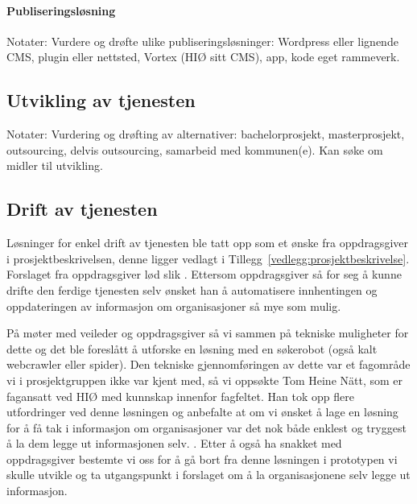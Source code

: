 \paragraph{Publiseringsløsning}
Notater:
Vurdere og drøfte ulike publiseringsløsninger: Wordpress eller lignende CMS, plugin eller nettsted, Vortex (HIØ sitt CMS), app, kode eget rammeverk.

\subsection{Utvikling av tjenesten}
Notater:
Vurdering og drøfting av alternativer: bachelorprosjekt, masterprosjekt, outsourcing, delvis outsourcing, samarbeid med kommunen(e).
Kan søke om midler til utvikling.

\subsection{Drift av tjenesten}
Løsninger for enkel drift av tjenesten ble tatt opp som et ønske fra oppdragsgiver i prosjektbeskrivelsen, denne ligger vedlagt i Tillegg~\ref{vedlegg:prosjektbeskrivelse}. Forslaget fra oppdragsgiver lød slik  \cite{PROSJEKTBESKRIVELSE:22}. Ettersom oppdragsgiver så for seg å kunne drifte den ferdige tjenesten selv ønsket han å automatisere innhentingen og oppdateringen av informasjon om organisasjoner så mye som mulig. 

På møter med veileder og oppdragsgiver så vi sammen på tekniske muligheter for dette og det ble foreslått å utforske en løsning med en søkerobot (også kalt webcrawler eller spider). Den tekniske gjennomføringen av dette var et fagområde vi i prosjektgruppen ikke var kjent med, så vi oppsøkte Tom Heine Nätt, som er fagansatt ved HIØ med kunnskap innenfor fagfeltet. Han tok opp flere utfordringer ved denne løsningen og anbefalte at om vi ønsket å lage en løsning for å få tak i informasjon om organisasjoner var det nok både enklest og tryggest å la dem legge ut informasjonen selv. \cite{WEBCRAWLER-SAMTALE:23}. Etter å også ha snakket med oppdragsgiver bestemte vi oss for å gå bort fra denne løsningen i prototypen vi skulle utvikle og ta utgangspunkt i forslaget om å la organisasjonene selv legge ut informasjon.

